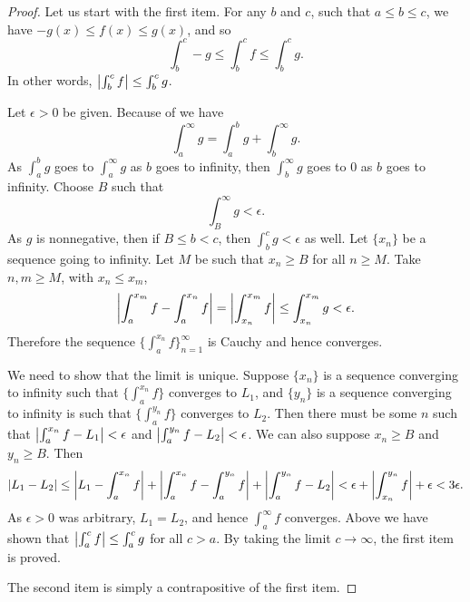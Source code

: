 \begin{proof}
Let us start with the first item.
For any $b$ and $c$, such that $a \leq b \leq c$, we have 
$-g(x) \leq f(x) \leq g(x)$, and so
\begin{equation*}
\int_b^c -g \leq \int_b^c f \leq \int_b^c g  .
\end{equation*}
In other words, $\left\lvert {\int_b^c f} \right\rvert \leq \int_b^c g$.

Let $\epsilon > 0$ be given.  Because
of  we have
\begin{equation*}
\int_a^\infty g =
\int_a^b g +
\int_b^\infty g .
\end{equation*}
As $\int_a^b g$ goes to
$\int_a^\infty g$ as $b$ goes to infinity, then
$\int_b^\infty g$ goes to 0 as $b$ goes to infinity.  Choose $B$
such that
\begin{equation*}
\int_B^\infty g < \epsilon .
\end{equation*}
As $g$ is nonnegative, then if $B \leq b < c$, then
$\int_b^c g < \epsilon$ as well.
Let $\{ x_n \}$ be a sequence going to infinity.  Let $M$ be such that
$x_n \geq B$ for all $n \geq M$.  Take $n, m \geq M$,
with $x_n \leq x_m$,
\begin{equation*}
\left\lvert {\int_a^{x_m} f - \int_a^{x_n} f} \right\rvert 
=
\left\lvert {\int_{x_n}^{x_m} f} \right\rvert 
\leq \int_{x_n}^{x_m} g < \epsilon .
\end{equation*}
Therefore the sequence $\{ \int_a^{x_n} f \}_{n=1}^\infty$ is Cauchy and hence converges.

We need to show that the limit is unique.  Suppose $\{ x_n \}$ is a sequence
converging to infinity such that
$\{ \int_a^{x_n} f \}$ converges to $L_1$, and $\{ y_n \}$ is a sequence
converging to infinity is such that
$\{ \int_a^{y_n} f \}$ converges to $L_2$.  Then there must be some $n$ such
that
$\left\lvert {\int_a^{x_n} f - L_1} \right\rvert < \epsilon$ and 
$\left\lvert {\int_a^{y_n} f - L_2} \right\rvert < \epsilon$.  We can also suppose $x_n \geq B$
and $y_n \geq B$.  Then
\begin{equation*}
\left\lvert {L_1 - L_2} \right\rvert \leq
\left\lvert {L_1 - \int_a^{x_n} f} \right\rvert
+
\left\lvert {\int_a^{x_n} f- \int_a^{y_n} f} \right\rvert
+
\left\lvert {\int_a^{y_n} f - L_2} \right\rvert
<
\epsilon
+
\left\lvert {\int_{x_n}^{y_n} f} \right\rvert
+
\epsilon
<
3 \epsilon.
\end{equation*}
As $\epsilon > 0$ was arbitrary, $L_1 = L_2$, and hence
$\int_a^\infty f$ converges.
Above we have shown that $\left\lvert {\int_a^c f} \right\rvert \leq \int_a^c g$ for all $c > a$.
By taking the limit $c \to \infty$, the first item is proved.

The second item is simply a contrapositive of the first item.
\end{proof}

